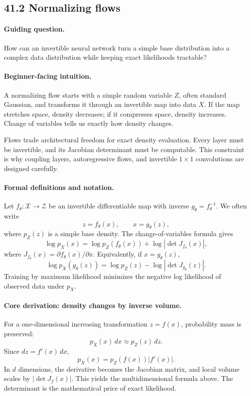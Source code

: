 \subsection{41.2 Normalizing flows}

\paragraph{Guiding question.}
How can an invertible neural network turn a simple base distribution into a complex data distribution while keeping exact likelihoods tractable?

\paragraph{Beginner-facing intuition.}
A normalizing flow starts with a simple random variable \(Z\), often standard Gaussian, and transforms it through an invertible map into data \(X\). If the map stretches space, density decreases; if it compresses space, density increases. Change of variables tells us exactly how density changes.

Flows trade architectural freedom for exact density evaluation. Every layer must be invertible, and its Jacobian determinant must be computable. This constraint is why coupling layers, autoregressive flows, and invertible \(1\times1\) convolutions are designed carefully.

\paragraph{Formal definitions and notation.}
Let \(f_\theta:\mathcal X\to\mathcal Z\) be an invertible differentiable map with inverse \(g_\theta=f_\theta^{-1}\). We often write
\[
z=f_\theta(x),\qquad x=g_\theta(z),
\]
where \(p_Z(z)\) is a simple base density. The change-of-variables formula gives
\[
\boxed{
\log p_X(x)
=\log p_Z(f_\theta(x))
+\log\left|\det J_{f_\theta}(x)\right|,
}
\]
where \(J_{f_\theta}(x)=\partial f_\theta(x)/\partial x\). Equivalently, if \(x=g_\theta(z)\),
\[
\log p_X(g_\theta(z))
=\log p_Z(z)-\log|\det J_{g_\theta}(z)|.
\]
Training by maximum likelihood minimizes the negative log likelihood of observed data under \(p_X\).

\paragraph{Core derivation: density changes by inverse volume.}
For a one-dimensional increasing transformation \(z=f(x)\), probability mass is preserved:
\[
p_X(x)\,dx\approx p_Z(z)\,dz.
\]
Since \(dz=f'(x)\,dx\),
\[
p_X(x)=p_Z(f(x))|f'(x)|.
\]
In \(d\) dimensions, the derivative becomes the Jacobian matrix, and local volume scales by \(|\det J_f(x)|\). This yields the multidimensional formula above. The determinant is the mathematical price of exact likelihood.

